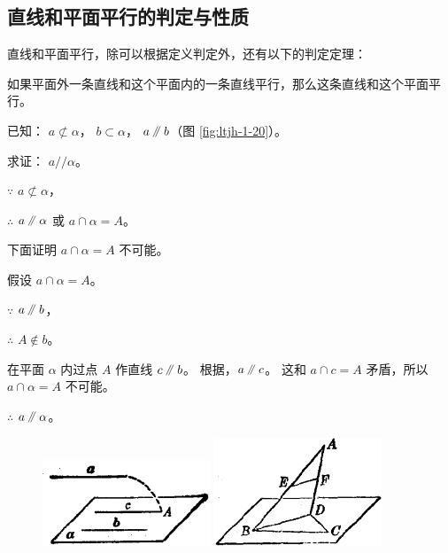 \subsection{直线和平面平行的判定与性质}\label{subsec:1-8}

直线和平面平行，除可以根据定义判定外，还有以下的判定定理：

\begin{dingli}[直线和平面平行的判定定理][dl:zxhpmpx-pd] %
    如果平面外一条直线和这个平面内的一条直线平行，那么这条直线和这个平面平行。
\end{dingli}

已知： $a \not \subset \alpha$，  $b \subset \alpha$， $a \pingxing b$（图 \ref{fig:ltjh-1-20}）。

求证： $a // \alpha$。

\zhengming $\because$ \quad  $a \not \subset \alpha$，

$\therefore$ \quad $a \pingxing \alpha$ 或 $a \cap \alpha = A$。

下面证明 $a \cap \alpha = A$ 不可能。

假设 $a \cap \alpha = A$。

$\because$ \quad $a \pingxing b$，

$\therefore$ \quad $A \not \in b$。

在平面 $\alpha$ 内过点 $A$ 作直线 $c \pingxing b$。
根据，$a \pingxing c$。
这和 $a \cap c = A$ 矛盾，所以 $a \cap \alpha = A$ 不可能。

$\therefore$ \quad $a \pingxing \alpha$。

\begin{figure}[htbp]
    \centering
    \begin{minipage}[b]{7cm}
        \centering
        \includegraphics[width=5cm]{../pic/ltjh-ch1-20.png}
        \caption{}\label{fig:ltjh-1-20}
    \end{minipage}
    \qquad
    \begin{minipage}[b]{7cm}
        \centering
        \includegraphics[width=5cm]{../pic/ltjh-ch1-21.png}
        \caption{}\label{fig:ltjh-1-21}
    \end{minipage}
\end{figure}

